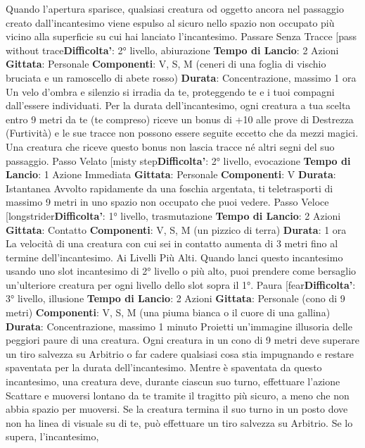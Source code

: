\begin{multicols}{2}
Quando l’apertura sparisce, qualsiasi creatura od
oggetto ancora nel passaggio creato dall’incantesimo
viene espulso al sicuro nello spazio non occupato più
vicino alla superficie su cui hai lanciato l’incantesimo.
Passare Senza Tracce
[pass without trace\textbf{Difficolta'}:
2° livello, abiurazione
\textbf{Tempo di Lancio}: 2 Azioni
\textbf{Gittata}: Personale
\textbf{Componenti}: V, S, M (ceneri di una foglia di vischio
bruciata e un ramoscello di abete rosso)
\textbf{Durata}: Concentrazione, massimo 1 ora
Un velo d’ombra e silenzio si irradia da te, proteggendo
te e i tuoi compagni dall’essere individuati. Per la durata
dell’incantesimo, ogni creatura a tua scelta entro 9 metri
da te (te compreso) riceve un bonus di +10 alle prove di
Destrezza (Furtività) e le sue tracce non possono
essere seguite eccetto che da mezzi magici. Una
creatura che riceve questo bonus non lascia tracce né
altri segni del suo passaggio.
Passo Velato
[misty step\textbf{Difficolta'}:
2° livello, evocazione
\textbf{Tempo di Lancio}: 1 Azione Immediata
\textbf{Gittata}: Personale
\textbf{Componenti}: V
\textbf{Durata}: Istantanea
Avvolto rapidamente da una foschia argentata, ti
teletrasporti di massimo 9 metri in uno spazio non
occupato che puoi vedere.
Passo Veloce
[longstrider\textbf{Difficolta'}:
1° livello, trasmutazione
\textbf{Tempo di Lancio}: 2 Azioni
\textbf{Gittata}: Contatto
\textbf{Componenti}: V, S, M (un pizzico di terra)
\textbf{Durata}: 1 ora
La velocità di una creatura con cui sei in contatto
aumenta di 3 metri fino al termine dell’incantesimo.
Ai Livelli Più Alti. Quando lanci questo incantesimo
usando uno slot incantesimo di 2° livello o più alto, puoi
prendere come bersaglio un’ulteriore creatura per ogni
livello dello slot sopra il 1°.
Paura
[fear\textbf{Difficolta'}:
3° livello, illusione
\textbf{Tempo di Lancio}: 2 Azioni
\textbf{Gittata}: Personale (cono di 9 metri)
\textbf{Componenti}: V, S, M (una piuma bianca o il cuore di
una gallina)
\textbf{Durata}: Concentrazione, massimo 1 minuto
Proietti un’immagine illusoria delle peggiori paure di una
creatura. Ogni creatura in un cono di 9 metri deve
superare un tiro salvezza su Arbitrio o far cadere
qualsiasi cosa stia impugnando e restare spaventata
per la durata dell’incantesimo.
Mentre è spaventata da questo incantesimo, una
creatura deve, durante ciascun suo turno, effettuare
l’azione Scattare e muoversi lontano da te tramite il
tragitto più sicuro, a meno che non abbia spazio per
muoversi. Se la creatura termina il suo turno in un posto
dove non ha linea di visuale su di te, può effettuare un
tiro salvezza su Arbitrio. Se lo supera, l’incantesimo,

\end{multicols}

